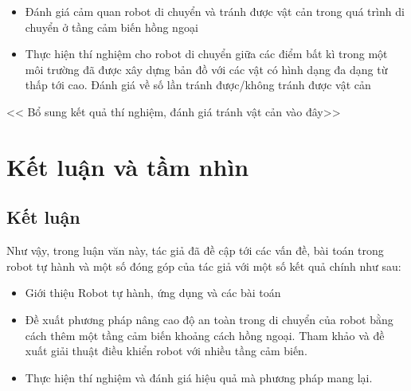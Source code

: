 {\begin{itemize}
    \item Đánh giá cảm quan robot di chuyển và tránh được vật cản trong quá trình di chuyển ở tầng cảm biến hồng ngoại
    \item Thực hiện thí nghiệm cho robot di chuyển giữa các điểm bất kì trong một môi trường đã được xây dựng bản đồ với các vật có hình dạng đa dạng từ thấp tới cao. Đánh giá về số lần tránh được/không tránh được vật cản
\end{itemize}

\begin{center}
    << Bổ sung kết quả thí nghiệm, đánh giá tránh vật cản vào đây>>
\end{center}


\chapter{Kết luận và tầm nhìn}
\label{chap:KetLuan}

\section{Kết luận}

Như vậy, trong luận văn này, tác giả đã đề cập tới các vấn đề, bài toán trong robot tự hành và một số đóng góp của tác giả với một số kết quả chính như sau:
\begin{itemize}
    \item Giới thiệu Robot tự hành, ứng dụng và các bài toán
    \item Đề xuất phương pháp nâng cao độ an toàn trong di chuyển của robot bằng cách thêm một tầng cảm biến khoảng cách hồng ngoại. Tham khảo và đề xuất giải thuật điều khiển robot với nhiều tầng cảm biến.
    \item Thực hiện thí nghiệm và đánh giá hiệu quả mà phương pháp mang lại.
\end{itemize}


}
